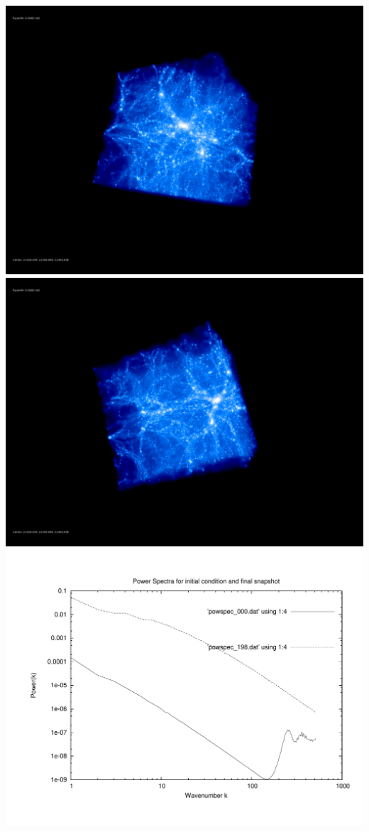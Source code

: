 \includegraphics[scale=0.1]{stages_51/rotate_00074.jpg} 
\includegraphics[scale=0.1]{stages_51/rotate_00131.jpg}  \\

\includegraphics[scale=0.5]{stages_51/plot_powspec_stages_51}


